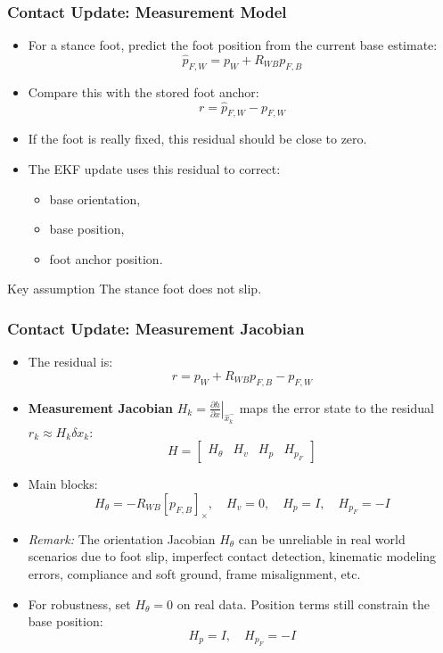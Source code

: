 \documentclass[aspectratio=169]{beamer}
\begin{document}
\begin{frame}
	\frametitle{Contact Update: Measurement Model}
	
	\begin{itemize}
		\item For a stance foot, predict the foot position from the current base estimate:
		\[
		\hat{p}_{F,W}
		=
		p_W + R_{WB}p_{F,B}
		\]
		
		\item Compare this with the stored foot anchor:
		\[
		r =
		\hat{p}_{F,W} - p_{F,W}
		\]
		
		\item If the foot is really fixed, this residual should be close to zero.
		
		\item The EKF update uses this residual to correct:
		\begin{itemize}
			\item base orientation,
			\item base position,
			\item foot anchor position.
		\end{itemize}
	\end{itemize}
	
	\begin{block}{Key assumption}
		The stance foot does not slip.
	\end{block}
	
\end{frame}


\begin{frame}
	\frametitle{Contact Update: Measurement Jacobian}
	
	\begin{itemize}
		\item The residual is:
		\[
		r =
		p_W + R_{WB}p_{F,B} - p_{F,W}
		\]
		
		\item \textbf{Measurement Jacobian} $H_k = \left.\frac{\partial h}{\partial x}\right|_{\hat{x}_k^-}$ maps the error state to the residual $r_k \approx H_k \delta x_k$:
		\[
		H =
		\begin{bmatrix}
			H_\theta & H_v & H_p & H_{p_F}
		\end{bmatrix}
		\]
		
		\item Main blocks:
		\[
		H_\theta = -R_{WB}[p_{F,B}]_\times,\quad
		H_v = 0,\quad
		H_p = I,\quad
		H_{p_F} = -I
		\]
		
		\item \textit{Remark:} The orientation Jacobian $H_\theta$ can be unreliable in real world scenarios due to foot slip, imperfect contact detection, kinematic modeling errors, compliance and soft ground, frame misalignment, etc.
		
		\item For robustness, set $H_\theta = 0$ on real data. Position terms still constrain the base position:
		\[
		H_p = I,\quad H_{p_F} = -I
		\]
	\end{itemize}
	
\end{frame}
\end{document}
